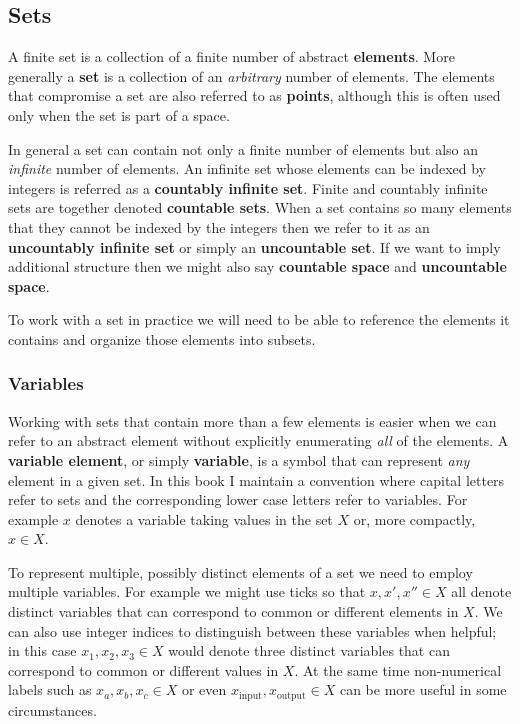 \documentclass[
  letterpaper,
  DIV=11,
  numbers=noendperiod]{scrartcl}
\begin{document}
\hypertarget{sets}{%
\subsection{Sets}\label{sets}}

A finite set is a collection of a finite number of abstract
\textbf{elements}. More generally a \textbf{set} is a collection of an
\emph{arbitrary} number of elements. The elements that compromise a set
are also referred to as \textbf{points}, although this is often used
only when the set is part of a space.

In general a set can contain not only a finite number of elements but
also an \emph{infinite} number of elements. An infinite set whose
elements can be indexed by integers is referred as a \textbf{countably
infinite set}. Finite and countably infinite sets are together denoted
\textbf{countable sets}. When a set contains so many elements that they
cannot be indexed by the integers then we refer to it as an
\textbf{uncountably infinite set} or simply an \textbf{uncountable set}.
If we want to imply additional structure then we might also say
\textbf{countable space} and \textbf{uncountable space}.

To work with a set in practice we will need to be able to reference the
elements it contains and organize those elements into subsets.

\hypertarget{variables}{%
\subsubsection{Variables}\label{variables}}

Working with sets that contain more than a few elements is easier when
we can refer to an abstract element without explicitly enumerating
\emph{all} of the elements. A \textbf{variable element}, or simply
\textbf{variable}, is a symbol that can represent \emph{any} element in
a given set. In this book I maintain a convention where capital letters
refer to sets and the corresponding lower case letters refer to
variables. For example \(x\) denotes a variable taking values in the set
\(X\) or, more compactly, \(x \in X\).

To represent multiple, possibly distinct elements of a set we need to
employ multiple variables. For example we might use ticks so that
\(x, x', x'' \in X\) all denote distinct variables that can correspond
to common or different elements in \(X\). We can also use integer
indices to distinguish between these variables when helpful; in this
case \(x_{1}, x_{2}, x_{3} \in X\) would denote three distinct variables
that can correspond to common or different values in \(X\). At the same
time non-numerical labels such as \(x_{a}, x_{b}, x_{c} \in X\) or even
\(x_{\text{input}}, x_{\text{output}} \in X\) can be more useful in some
circumstances.
\end{document}
